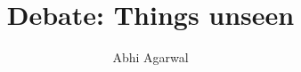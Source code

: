 \documentclass[11pt, oneside]{article}
\title{Debate: Things unseen}
\author{Abhi Agarwal}
\date{}
\begin{document}
\maketitle

\par 
\end{document}
